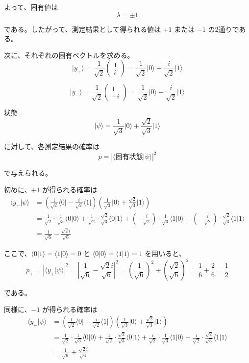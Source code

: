 \documentclass[11pt,a4paper]{ltjsarticle}
\begin{document}
よって、固有値は
\[
\lambda = \pm 1
\]

である。したがって、測定結果として得られる値は $+1$ または $-1$ の2通りである。

次に、それぞれの固有ベクトルを求める。
\[
\lvert y_+\rangle = \frac{1}{\sqrt{2}}
\begin{pmatrix}
1 \\
i
\end{pmatrix}
= \frac{1}{\sqrt{2}}\lvert 0\rangle + \frac{i}{\sqrt{2}}\lvert 1\rangle
\]

\[
\lvert y_-\rangle = \frac{1}{\sqrt{2}}
\begin{pmatrix}
1 \\
-i
\end{pmatrix}
= \frac{1}{\sqrt{2}}\lvert 0\rangle - \frac{i}{\sqrt{2}}\lvert 1\rangle
\]

状態
\[
\lvert \psi\rangle = \frac{1}{\sqrt{3}}\lvert 0\rangle + \frac{\sqrt{2}}{\sqrt{3}}\lvert 1\rangle
\]

に対して、各測定結果の確率は
\[
p = \left|\langle \text{固有状態} \vert \psi\rangle\right|^2
\]

で与えられる。

初めに、$+1$ が得られる確率は
\begin{align*}
\langle y_+ \vert \psi\rangle
&= \left(\frac{1}{\sqrt{2}}\langle 0\rvert - \frac{i}{\sqrt{2}}\langle 1\rvert\right)
   \left(\frac{1}{\sqrt{3}}\lvert 0\rangle + \frac{\sqrt{2}}{\sqrt{3}}\lvert 1\rangle\right) \\
&= \frac{1}{\sqrt{2}}\cdot\frac{1}{\sqrt{3}}\langle 0 \vert 0\rangle
 + \frac{1}{\sqrt{2}}\cdot\frac{\sqrt{2}}{\sqrt{3}}\langle 0 \vert 1\rangle
 + \left(-\frac{i}{\sqrt{2}}\right)\cdot\frac{1}{\sqrt{3}}\langle 1 \vert 0\rangle
 + \left(-\frac{i}{\sqrt{2}}\right)\cdot\frac{\sqrt{2}}{\sqrt{3}}\langle 1 \vert 1\rangle \\
&= \frac{1}{\sqrt{6}} - \frac{\sqrt{2}i}{\sqrt{6}}
\end{align*}

ここで、$\langle 0 \vert 1\rangle = \langle 1 \vert 0\rangle = 0$ と
$\langle 0 \vert 0\rangle = \langle 1 \vert 1\rangle = 1$ を用いると、
\[
p_+ = \left|\langle y_+ \vert \psi\rangle\right|^2
= \left|\frac{1}{\sqrt{6}} - \frac{\sqrt{2}i}{\sqrt{6}}\right|^2
= \left(\frac{1}{\sqrt{6}}\right)^2 + \left(\frac{\sqrt{2}}{\sqrt{6}}\right)^2
= \frac{1}{6} + \frac{2}{6}
= \frac{1}{2}
\]

である。

同様に、$-1$ が得られる確率は
\begin{align*}
\langle y_- \vert \psi\rangle
&= \left(\frac{1}{\sqrt{2}}\langle 0\rvert + \frac{i}{\sqrt{2}}\langle 1\rvert\right)
   \left(\frac{1}{\sqrt{3}}\lvert 0\rangle + \frac{\sqrt{2}}{\sqrt{3}}\lvert 1\rangle\right) \\
&= \frac{1}{\sqrt{2}}\cdot\frac{1}{\sqrt{3}}\langle 0 \vert 0\rangle
 + \frac{1}{\sqrt{2}}\cdot\frac{\sqrt{2}}{\sqrt{3}}\langle 0 \vert 1\rangle
 + \frac{i}{\sqrt{2}}\cdot\frac{1}{\sqrt{3}}\langle 1 \vert 0\rangle
 + \frac{i}{\sqrt{2}}\cdot\frac{\sqrt{2}}{\sqrt{3}}\langle 1 \vert 1\rangle \\
&= \frac{1}{\sqrt{6}} + \frac{\sqrt{2}i}{\sqrt{6}}
\end{align*}
\end{document}
